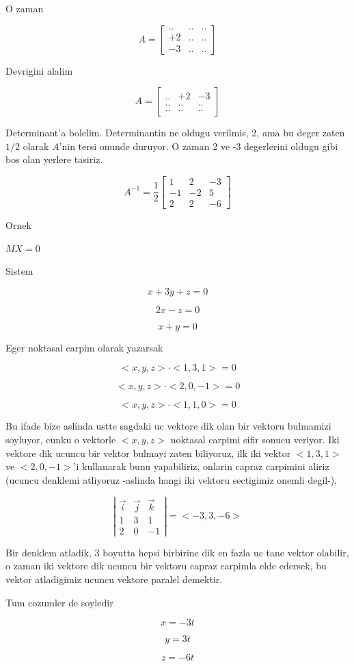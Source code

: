 \documentclass[12pt,fleqn]{article}
\begin{document}
O zaman

\[ A = 
\left[\begin{array}{rrr}
.. & .. & ..\\
+2 & .. & ..\\
-3 & .. & ..
\end{array}\right]
 \]

Devrigini alalim

\[ A = 
\left[\begin{array}{rrr}
.. & +2 & -3\\
.. & .. & ..\\
.. & .. & ..
\end{array}\right]
 \]

Determinant'a bolelim. Determinantin ne oldugu verilmis, 2, ama bu deger zaten $1/2$
olarak $A$'nin tersi onunde duruyor. O zaman 2 ve -3 degerlerini oldugu gibi bos
olan yerlere tasiriz. 

\[ A^{-1} = \frac{1}{2}
\left[\begin{array}{rrr}
1 & 2 & -3 \\
-1 & -2 & 5 \\
2 & 2 & -6
\end{array}\right]
 \]


Ornek

$MX = 0$

Sistem

\[ x + 3y + z = 0 \]

\[ 2x - z  = 0\]

\[ x + y = 0 \]

Eger noktasal carpim olarak yazarsak 

\[ <x,y,z> \cdot <1,3,1> = 0 \]

\[ <x,y,z> \cdot <2,0,-1> = 0 \]

\[ <x,y,z> \cdot <1,1,0> = 0 \]

Bu ifade bize aslinda ustte sagdaki uc vektore dik olan bir vektoru bulmamizi
soyluyor, cunku o vektorle $<x,y,z>$ noktasal carpimi sifir sonucu veriyor. Iki
vektore dik ucuncu bir vektor bulmayi zaten biliyoruz, ilk iki vektor $<1,3,1>$
ve $<2,0,-1>$'i kullanarak bunu yapabiliriz, onlarin capraz carpimini aliriz
(ucuncu denklemi atliyoruz -aslinda hangi iki vektoru sectigimiz onemli degil-),

\[ 
\left|\begin{array}{rrr}
\vec{i} & \vec{j} & \vec{k}  \\
1 & 3 & 1 \\
2 & 0 & -1
\end{array}\right| = <-3,3,-6>
\]

Bir denklem atladik, 3 boyutta hepsi birbirine dik en fazla uc tane vektor
olabilir, o zaman iki vektore dik ucuncu bir vektoru capraz carpimla elde
edersek, bu vektor atladigimiz ucuncu vektore paralel demektir. 

Tum cozumler de soyledir

\[ x = -3t \]

\[ y = 3t \]

\[ z = -6t \]
\end{document}
